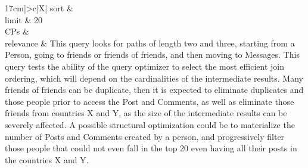\begin{tabularx}{17cm}{|>{\small \sf}c|X|}
%
	sort        &
	\vspace{1.1ex} \\ \hline
	limit       & 20 \\ \hline
	CPs &
	 \\ \hline
    relevance &
      \small This query looks for paths of length two and three, starting from a Person, going to friends or friends of friends, and
then moving to Messages. This query tests the ability of the query optimizer to select the most efficient join ordering,
which will depend on the cardinalities of the intermediate results. Many friends of friends can be duplicate, then it is
expected to eliminate duplicates and those people prior to access the Post and Comments, as well as eliminate those
friends from countries X and Y, as the size of the intermediate results can be severely affected. A possible structural
optimization could be to materialize the number of Posts and Comments created by a person, and progressively
filter those people that could not even fall in the top 20 even having all their posts in the countries X and Y.
 \\ \hline%
\end{tabularx}
\vspace{2ex}